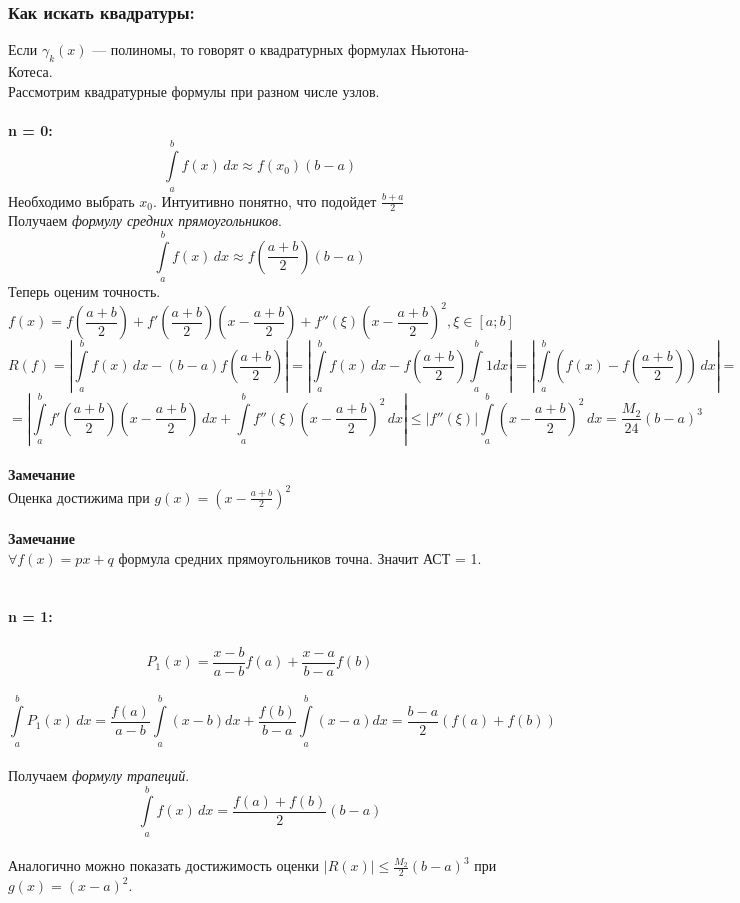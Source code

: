 \subsubsection{Как искать квадратуры:}
Если $\gamma_k(x)$ --- полиномы, то говорят о квадратурных формулах Ньютона-Котеса.\\
Рассмотрим квадратурные формулы при разном числе узлов.\\
\\
\textbf{n = 0:}\\
\[
\int\limits_{a}^{b} f(x) \, dx  \approx f(x_0)(b-a)
\]
Необходимо выбрать $x_0$. Интуитивно понятно, что подойдет $\frac{b+a}{2}$\\
Получаем \textit{формулу средних прямоугольников}.\\
\[
\int\limits_{a}^{b} f(x) \, dx  \approx f(\frac{a+b}{2})(b-a)
\]
Теперь оценим точность.\\
\[
f(x) = f(\frac{a+b}{2}) +f'(\frac{a+b}{2})(x- \frac{a+b}{2}) + f''(\xi)(x- \frac{a+b}{2})^2 , \xi \in [a;b]
\]
\[
R(f) = |\int\limits_{a}^{b} f(x) \, dx  - (b-a)f(\frac{a+b}{2})| =|\int\limits_{a}^{b} f(x) \, dx  - f(\frac{a+b}{2})\int\limits_{a}^{b}1 dx| = |\int\limits_{a}^{b} (f(x)-f(\frac{a+b}{2})) \, dx| =
\]
\[ = |\int\limits_{a}^{b} f'(\frac{a+b}{2})(x-\frac{a+b}{2}) \, dx + \int\limits_{a}^{b} f''(\xi)(x- \frac{a+b}{2})^2 \, dx| \leq |f''(\xi)|\int\limits_{a}^{b}(x- \frac{a+b}{2})^2 \, dx = \frac{M_2}{24}(b-a)^3
\]\\
\textbf{Замечание}\\
Оценка достижима при $g(x) = (x-\frac{a+b}{2})^2$\\
\\
\textbf{Замечание}\\
$\forall f(x) = px + q$ формула средних прямоугольников точна. Значит АСТ = 1.\\
\\
\\
\textbf{n = 1:}\\
\\
\[P_1(x) = \frac{x-b}{a-b}f(a) + \frac{x-a}{b-a}f(b)\]\\
\[
\int\limits_{a}^{b} P_1(x) \, dx = \frac{f(a)}{a-b}\int\limits_{a}^{b}(x-b)dx + \frac{f(b)}{b-a}\int\limits_{a}^{b}(x-a)dx = \frac{b-a}{2}(f(a) + f(b))
\]\\
Получаем \textit{формулу трапеций}.\\
\[
\int\limits_{a}^{b} f(x) \, dx = \frac{f(a)+f(b)}{2}(b-a)
\]\\
Аналогично можно показать достижимость оценки $|R(x)| \leq \frac{M_2}{2}(b-a)^3$ при $g(x) = (x-a)^2$.\\
